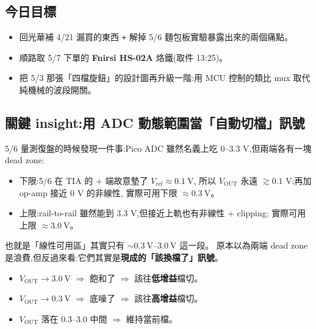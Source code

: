 
\subsection*{今日目標}

\begin{itemize}[leftmargin=2em,itemsep=0pt]
  \item 回光華補 4/21 漏買的東西 \texttt{+} 解掉 5/6 麵包板實驗暴露出來的兩個痛點。
  \item 順路取 5/7 下單的 \textbf{Fnirsi HS-02A} 烙鐵(取件 13:25)。
  \item 把 5/3 那張「四檔旋鈕」的設計圖再升級一階:用 MCU 控制的類比 mux 取代純機械的波段開關。
\end{itemize}

\subsection*{關鍵 insight:用 ADC 動態範圍當「自動切檔」訊號}

5/6 量測復盤的時候發現一件事:Pico ADC 雖然名義上吃 0--3.3 V,但兩端各有一塊 dead zone:

\begin{itemize}[leftmargin=2em,itemsep=0pt]
  \item 下限:5/6 在 TIA 的 \(+\) 端故意墊了 \(V_\text{ref} \approx \SI{0.1}{\volt}\),
        所以 \(V_\text{OUT}\) 永遠 \(\gtrsim 0.1\) V;再加 op-amp 接近 0 V 的非線性,
        實際可用下限 \(\approx \SI{0.3}{\volt}\)。
  \item 上限:rail-to-rail 雖然能到 3.3 V,但接近上軌也有非線性 + clipping;
        實際可用上限 \(\approx \SI{3.0}{\volt}\)。
\end{itemize}

也就是「線性可用區」其實只有 \(\sim \SI{0.3}{\volt}\)--\(\SI{3.0}{\volt}\) 這一段。
原本以為兩端 dead zone 是浪費,但反過來看:它們其實是\textbf{現成的「該換檔了」訊號}。

\begin{itemize}[leftmargin=2em,itemsep=0pt]
  \item \(V_\text{OUT} \to \SI{3.0}{\volt}\) \(\Rightarrow\) 飽和了 \(\Rightarrow\) 該往\textbf{低增益}檔切。
  \item \(V_\text{OUT} \to \SI{0.3}{\volt}\) \(\Rightarrow\) 底噪了 \(\Rightarrow\) 該往\textbf{高增益}檔切。
  \item \(V_\text{OUT}\) 落在 \(0.3\)--\(3.0\) 中間 \(\Rightarrow\) 維持當前檔。
\end{itemize}

